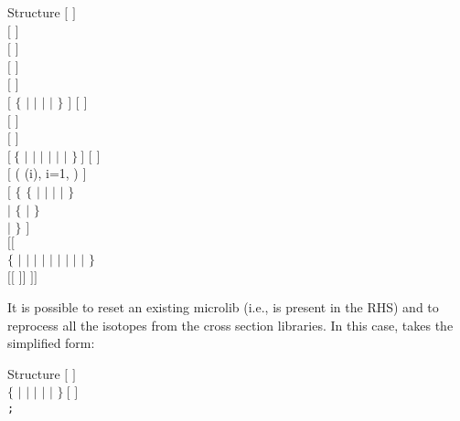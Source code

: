 \begin{DataStructure}{Structure }
$[$   $]$ \\
$[$   $]$ \\
$[$   $]$ \\
$[$   $]$ \\
$[$   $]$ \\
$[$  $\{$  $|$  $|$  $|$  $|$  $\}$ $]$
$[$    $]$ \\
$[$  $]$ \\
$[$  $]$ \\ 
$[~\{$  $|$  $|$  $|$  $|$  $|$  $|$  $\}~]$ $[$
 $]$\\ 
$[$    ( (i), i=1, ) $]$  \\
$[$  $\{$  $\{$  $|$  $|$    $|$   $|$   $\}$   \\
\hskip 0.8cm $|$  $\{$  $|$  $\}$    \\
\hskip 0.8cm $|$   $\}$ $]$ \\
$[[$   \\
\hskip 0.8cm  $\{$  $|$   $|$    $|$
                     $|$  $|$  $|$   $|$    
                   $|$  $|$  $\}$ \\
\hskip 0.8cm    
$[[$  $]]$ $]]$
\end{DataStructure}

\noindent It is possible to reset an existing microlib (i.e.,  is present
in the RHS) and to reprocess all the isotopes from the cross section libraries.
In this case,  takes the simplified form:

\begin{DataStructure}{Structure }
$[$   $]$ \\
$\{$  $|$  $|$  $|$  $|$  $|$  $\}~[$  $]$ \\ 
 {\tt ;}
\end{DataStructure}

